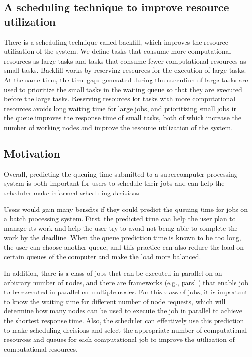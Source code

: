 \documentclass[conference,compsoc]{IEEEtran}
\begin{document}
\subsection{A scheduling technique to improve resource utilization}

There is a scheduling technique called backfill, which improves the resource utilization of the system. We define tasks that consume more computational resources as large tasks and tasks that consume fewer computational resources as small tasks. Backfill works by reserving resources for the execution of large tasks. At the same time, the time gaps generated during the execution of large tasks are used to prioritize the small tasks in the waiting queue so that they are executed before the large tasks. Reserving resources for tasks with more computational resources avoids long waiting time for large jobs, and prioritizing small jobs in the queue improves the response time of small tasks, both of which increase the number of working nodes and improve the resource utilization of the system.

\subsection{Motivation}

Overall, predicting the queuing time submitted to a supercomputer processing system is both important for users to schedule their jobs and can help the scheduler make informed scheduling decisions.

Users would gain many benefits if they could predict the queuing time for jobs on a batch processing system. First, the predicted time can help the user plan to manage its work and help the user try to avoid not being able to complete the work by the deadline. When the queue prediction time is known to be too long, the user can choose another queue, and this practice can also reduce the load on certain queues of the computer and make the load more balanced.

In addition, there is a class of jobs that can be executed in parallel on an arbitrary number of nodes, and there are frameworks (e.g., parsl \cite{babuji2019parsl}) that enable job to be executed in parallel on multiple nodes. For this class of jobs, it is important to know the waiting time for different number of node requests, which will determine how many nodes can be used to execute the job in parallel to achieve the shortest response time. Also, the scheduler can effectively use this prediction to make scheduling decisions and select the appropriate number of computational resources and queues for each computational job to improve the utilization of computational resources.
\end{document}
